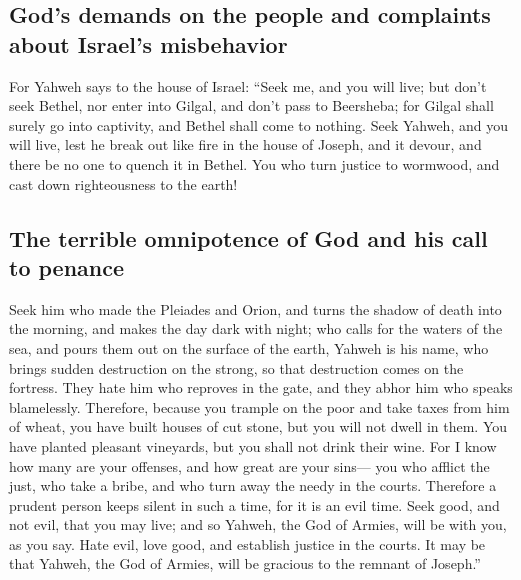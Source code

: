 \hypertarget{gods-demands-on-the-people-and-complaints-about-israels-misbehavior}{%
\subsection{God's demands on the people and complaints about Israel's
misbehavior}\label{gods-demands-on-the-people-and-complaints-about-israels-misbehavior}}

 For Yahweh says to the house of Israel: ``Seek me, and
you will live;  but don't seek Bethel, nor enter into
Gilgal, and don't pass to Beersheba; for Gilgal shall surely go into
captivity, and Bethel shall come to nothing.  Seek Yahweh,
and you will live, lest he break out like fire in the house of Joseph,
and it devour, and there be no one to quench it in Bethel.
 You who turn justice to wormwood, and cast down
righteousness to the earth!

\hypertarget{the-terrible-omnipotence-of-god-and-his-call-to-penance}{%
\subsection{The terrible omnipotence of God and his call to
penance}\label{the-terrible-omnipotence-of-god-and-his-call-to-penance}}

 Seek him who made the Pleiades and Orion, and turns the
shadow of death into the morning, and makes the day dark with night; who
calls for the waters of the sea, and pours them out on the surface of
the earth, Yahweh is his name,  who brings sudden
destruction on the strong, so that destruction comes on the fortress.
 They hate him who reproves in the gate, and they abhor
him who speaks blamelessly.  Therefore, because you
trample on the poor and take taxes from him of wheat, you have built
houses of cut stone, but you will not dwell in them. You have planted
pleasant vineyards, but you shall not drink their wine. 
For I know how many are your offenses, and how great are your sins---
you who afflict the just, who take a bribe, and who turn away the needy
in the courts.  Therefore a prudent person keeps silent
in such a time, for it is an evil time.  Seek good, and
not evil, that you may live; and so Yahweh, the God of Armies, will be
with you, as you say.  Hate evil, love good, and
establish justice in the courts. It may be that Yahweh, the God of
Armies, will be gracious to the remnant of Joseph.''

